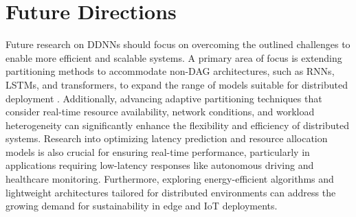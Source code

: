 \documentclass[conference]{IEEEtran}
\begin{document}




\section{Future Directions}

Future research on DDNNs should focus on overcoming the outlined challenges to enable more efficient and scalable systems. A primary area of focus is extending partitioning methods to accommodate non-DAG architectures, such as RNNs, LSTMs, and transformers, to expand the range of models suitable for distributed deployment \cite{zhang2021dynamic, zhao2018deepthings}. Additionally, advancing adaptive partitioning techniques that consider real-time resource availability, network conditions, and workload heterogeneity can significantly enhance the flexibility and efficiency of distributed systems. Research into optimizing latency prediction and resource allocation models is also crucial for ensuring real-time performance, particularly in applications requiring low-latency responses like autonomous driving and healthcare monitoring. Furthermore, exploring energy-efficient algorithms and lightweight architectures tailored for distributed environments can address the growing demand for sustainability in edge and IoT deployments.

\end{document}
